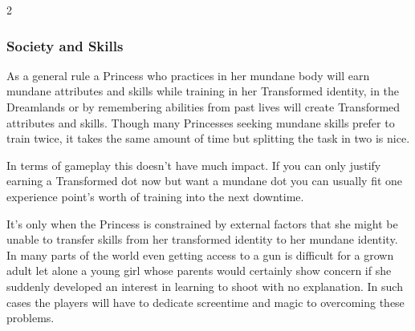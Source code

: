 \begin{multicols}{2}
\begin{mybox}

\subsubsection*{Society and Skills}

As a general rule a Princess who practices in her mundane body will earn mundane attributes and skills while training in her Transformed identity, in the Dreamlands or by remembering abilities from past lives will create Transformed attributes and skills. Though many Princesses seeking mundane skills prefer to train twice, it takes the same amount of time but splitting the task in two is nice. 

In terms of gameplay this doesn’t have much impact. If you can only justify earning a Transformed dot now but want a mundane dot you can usually fit one experience point's worth of training into the next downtime. 

It's only when the Princess is constrained by external factors that she might be unable to transfer skills from her transformed identity to her mundane identity. In many parts of the world even getting access to a gun is difficult for a grown adult let alone a young girl whose parents would certainly show concern if she suddenly developed an interest in learning to shoot with no explanation. In such cases the players will have to dedicate screentime and magic to overcoming these problems.

\end{mybox}

\end{multicols}\newpage{}
